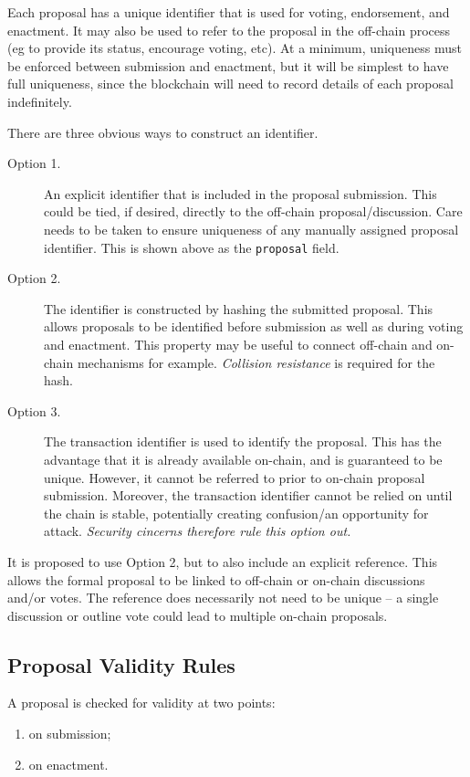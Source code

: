 Each proposal has a unique identifier that is used for voting, endorsement, and enactment.  It may also be used to refer to the proposal in the off-chain process (eg to provide its
status, encourage voting, etc).  At a minimum, uniqueness must be enforced between submission and enactment, but it will be simplest to have full uniqueness, since the blockchain will need to record
details of each proposal indefinitely.

There are three obvious ways to construct an identifier.

\begin{description}
\item
  [Option 1.]
  An explicit identifier that is included in the proposal submission.  This could be tied, if desired, directly to the off-chain proposal/discussion.
  Care needs to be taken to ensure uniqueness of any manually assigned proposal identifier.  This is shown above as the \texttt{proposal} field.
\item
  [Option 2.]
  The identifier is constructed by hashing the submitted proposal.  This allows proposals to be identified before submission as well as during voting and enactment.  This property may be
  useful to connect off-chain and on-chain mechanisms for example.  \emph{Collision resistance} is required for the hash. %
\item
  [Option 3.]
  The transaction identifier is used to identify the proposal.  This has the advantage that it is already available on-chain, and is guaranteed to be unique.  However, it cannot be
  referred to prior to on-chain proposal submission.  Moreover, the transaction identifier cannot be relied on until the chain is stable, potentially creating confusion/an opportunity for attack.  \emph{Security cincerns therefore rule this option out.}
\end{description}

It is proposed to use Option 2, but to also include an explicit reference.  This allows
the formal proposal to be linked to off-chain or on-chain discussions and/or votes.
The reference does necessarily not need to be unique -- a single discussion or outline vote could
lead to multiple on-chain proposals.

\subsection{Proposal Validity Rules}
\label{sect:validity}

A proposal is checked for validity at two points:
\begin{enumerate}
\item
  on submission;
\item
  on enactment.
\end{enumerate}

